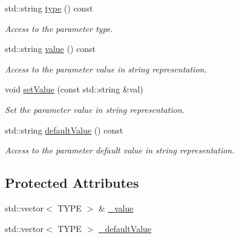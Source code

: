 \begin{DoxyCompactItemize}
std\+::string \hyperlink{class_d_d4hep_1_1_d_d_segmentation_1_1_typed_segmentation_parameter_3_01std_1_1vector_3_01_t_y_p_e_01_4_01_4_ae4f6da133bbd4b71b2593db7bf26824a}{type} () const
\begin{DoxyCompactList}\small\item\em Access to the parameter type. \end{DoxyCompactList}\item 
std\+::string \hyperlink{class_d_d4hep_1_1_d_d_segmentation_1_1_typed_segmentation_parameter_3_01std_1_1vector_3_01_t_y_p_e_01_4_01_4_a347b2aa67cdbf97444bb0d41d4ab29e9}{value} () const
\begin{DoxyCompactList}\small\item\em Access to the parameter value in string representation. \end{DoxyCompactList}\item 
void \hyperlink{class_d_d4hep_1_1_d_d_segmentation_1_1_typed_segmentation_parameter_3_01std_1_1vector_3_01_t_y_p_e_01_4_01_4_ad36f5a4953d42c4d9252423f129c50de}{set\+Value} (const std\+::string \&val)
\begin{DoxyCompactList}\small\item\em Set the parameter value in string representation. \end{DoxyCompactList}\item 
std\+::string \hyperlink{class_d_d4hep_1_1_d_d_segmentation_1_1_typed_segmentation_parameter_3_01std_1_1vector_3_01_t_y_p_e_01_4_01_4_a399394999d0a86783838625ed8545c95}{default\+Value} () const
\begin{DoxyCompactList}\small\item\em Access to the parameter default value in string representation. \end{DoxyCompactList}\end{DoxyCompactItemize}
\subsection*{Protected Attributes}
\begin{DoxyCompactItemize}
\item 
std\+::vector$<$ T\+Y\+PE $>$ \& \hyperlink{class_d_d4hep_1_1_d_d_segmentation_1_1_typed_segmentation_parameter_3_01std_1_1vector_3_01_t_y_p_e_01_4_01_4_ac1ad16f1b2e4175cd7c428417fa8e038}{\+\_\+value}
\item 
std\+::vector$<$ T\+Y\+PE $>$ \hyperlink{class_d_d4hep_1_1_d_d_segmentation_1_1_typed_segmentation_parameter_3_01std_1_1vector_3_01_t_y_p_e_01_4_01_4_a8756d0b27bf93d8e6d00a98d3038a1bd}{\+\_\+default\+Value}
\end{DoxyCompactItemize}
